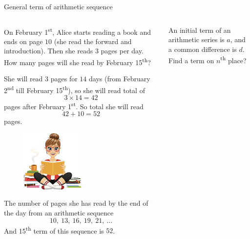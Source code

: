 \documentclass[9pt,aspectratio=169]{beamer}
\begin{document}
\begin{frame}{General term of arithmetic sequence}
  \begin{columns}[T]
    \begin{column}{0.5\textwidth}
      \begin{problem}
        On February 1\textsuperscript{st}, Alice starts reading a book and ends on page $10$ (she read the forward and introduction). Then she reads $3$ pages per day. How many pages will she read by February 15\textsuperscript{th}?
      \end{problem}
      She will read $3$ pages for $14$ days (from February 2\textsuperscript{nd} till February 15\textsuperscript{th}), so she will read total of 
      \[ 3 \times 14 = 42 \]
      pages after February 1\textsuperscript{st}. So total she will read 
      \[ 42 + 10 = 52 \]
      pages.
      \begin{figure}
        \vspace*{-2.5em}
        \includegraphics[width=0.5\textwidth]{06 - Arithmetic Sequences/reading.jpg}
      \end{figure}
      The number of pages she has read by the end of the day from an arithmetic sequence
      \[ 10,\ 13,\ 16,\ 19,\ 21,\ \ldots \]
      And 15\textsuperscript{th} term of this sequence is $52$.
    \end{column}
    \begin{column}{0.5\textwidth}
      \begin{problem}
        An initial term of an arithmetic series is $a$, and a common difference is $d$. Find a term on $n$\textsuperscript{th} place?
      \end{problem}


\end{column}
\end{columns}
\end{frame}
\end{document}
